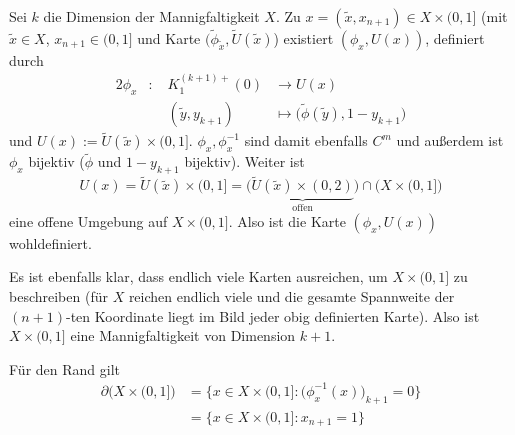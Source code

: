 \documentclass{mywork}
\begin{document}
	\setcounter{section}{11}

	\begin{aufgabe}~
		
		Sei $k$ die Dimension der Mannigfaltigkeit $X$.
		Zu $x = (\tilde x, x_{n+1}) \in X \times (0,1]$ (mit $\tilde x \in X$, $x_{n+1} \in (0,1]$ und Karte $(\tilde\phi_{\tilde x}, \tilde U(\tilde x)$) existiert $(\phi_x, U(x))$, definiert durch
		\begin{alignat*}{2}
			\phi_x &:\; &K_1^{(k+1)+}(0) &\to U(x) \\
			 &&(\tilde y, y_{k+1}) &\mapsto \big( \tilde \phi(\tilde y), 1-y_{k+1} \big)
		\end{alignat*}
		und $U(x) := \tilde U(\tilde x) \times (0,1]$.
		$\phi_x, \phi_x^{-1}$ sind damit ebenfalls $C^m$ und außerdem ist $\phi_x$ bijektiv ($\tilde \phi$ und $1-y_{k+1}$ bijektiv).
		Weiter ist 
		\[
			U(x) = \tilde U(\tilde x) \times (0,1] = \big(\underbrace{\tilde U(\tilde x) \times (0,2)}_{\text{offen}} \big) \cap \big(X \times (0,1]\big)
		\]
		eine offene Umgebung auf $X \times (0,1]$.
		Also ist die Karte $(\phi_x, U(x))$ wohldefiniert. 
		
		Es ist ebenfalls klar, dass endlich viele Karten ausreichen, um $X \times (0,1]$ zu beschreiben (für $X$ reichen endlich viele und die gesamte Spannweite der $(n+1)$-ten Koordinate liegt im Bild jeder obig definierten Karte).
		Also ist $X\times (0,1]$ eine Mannigfaltigkeit von Dimension $k+1$.

		Für den Rand gilt
		\begin{align*}
			\partial \big(X \times (0,1] \big) &= \Big\{ x \in X\times (0,1] : \big( \phi_x^{-1}(x) \big)_{k+1} = 0 \Big\} \\
			&= \Big\{ x \in X\times(0,1] : x_{n+1} = 1 \Big\}
		\end{align*}
	\end{aufgabe}
\end{document}
